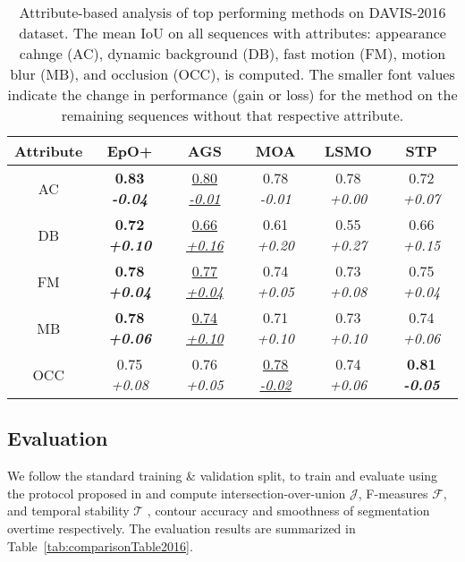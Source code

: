 \documentclass[10pt,twocolumn,letterpaper]{article}
\newcommand{\rowSpace}{\vspace{-0.4cm}}
\begin{document}
\setlength{\tabcolsep}{1.4pt}
\begin{table}[!h]
\begin{center}
\centering
\begin{tabular}{c|c|cccc}
\hline
\hline
Attribute & EpO+ & AGS\cite{ags} & MOA\cite{MotAdapt} & LSMO\cite{lsmo} & STP\cite{STP} 
\\
\hline
AC    
&\bf 0.83 \emph{\scriptsize{-0.04}}     & \underline{0.80
\emph{\scriptsize{-0.01}}}    &    0.78
\emph{\scriptsize{-0.01}}    &    0.78
\emph{\scriptsize{+0.00}}    &    0.72 \emph{\scriptsize{+0.07}}
\\
DB    &\bf 0.72 \emph{\scriptsize{+0.10}}    & \underline{0.66
\emph{\scriptsize{+0.16}}}    & 0.61
\emph{\scriptsize{+0.20}}    & 0.55
\emph{\scriptsize{+0.27}}    & 0.66 \emph{\scriptsize{+0.15}}
\\
FM    &\bf 0.78 \emph{\scriptsize{+0.04}}     & \underline{0.77
\emph{\scriptsize{+0.04}}}    & 0.74
\emph{\scriptsize{+0.05}}    & 0.73
\emph{\scriptsize{+0.08}}    & 0.75 \emph{\scriptsize{+0.04}}
\\
MB    &\bf 0.78 \emph{\scriptsize{+0.06}}    & \underline{0.74 \emph{\scriptsize{+0.10}}}    &    0.71 \emph{\scriptsize{+0.10}}    &    0.73 \emph{\scriptsize{+0.10}}    &    0.74 \emph{\scriptsize{+0.06}}          
\\
OCC    & 0.75 \emph{\scriptsize{+0.08}} &    0.76 \emph{\scriptsize{+0.05}}    & \underline{0.78 \emph{\scriptsize{-0.02}}}    &    0.74 \emph{\scriptsize{+0.06}}    &   \bf 0.81
\emph{\scriptsize{-0.05}}
\\
\hline
\hline
\end{tabular}
\caption{Attribute-based analysis of top performing methods on DAVIS-2016 dataset. The mean IoU on all sequences with attributes: appearance cahnge (AC), dynamic background (DB), fast motion (FM), motion blur (MB), and occlusion (OCC), is computed. The smaller font values indicate the change in performance (gain or loss) for the method on the remaining sequences without that respective attribute. \label{tab:attributeAnalysisDAVIS2016}}
\rowSpace
\rowSpace
\end{center}
\end{table}
\setlength{\tabcolsep}{1.4pt}
\vspace{-0.1cm}


\subsection{Evaluation}
We follow the standard training \& validation split, to train and evaluate using the protocol proposed in \cite{DAVIS2016} and compute intersection-over-union $\mathcal{J}$, F-measures $\mathcal{F}$, and temporal stability $\mathcal{T}$ 
, contour accuracy and smoothness of segmentation overtime respectively. The evaluation results are summarized in Table~\ref{tab:comparisonTable2016}.
\end{document}
